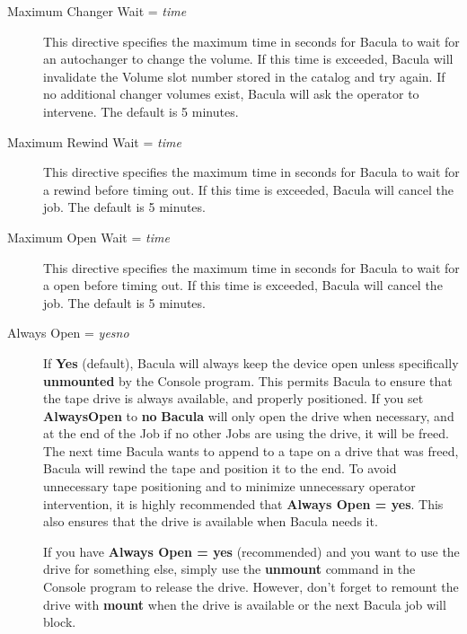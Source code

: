 \begin{description}
\item [Maximum Changer Wait = {\it time}]
   This directive specifies the maximum time in seconds for Bacula to wait
   for an autochanger to change the volume.  If this time is exceeded,
   Bacula will invalidate the Volume slot number stored in the catalog and
   try again.  If no additional changer volumes exist, Bacula will ask the
   operator to intervene.  The default is 5 minutes.      

\item [Maximum Rewind Wait = {\it time}]
   This directive specifies the maximum time in seconds for Bacula to wait
   for a rewind before timing out.  If this time is exceeded,
   Bacula will cancel the job.  The default is 5 minutes.

\item [Maximum Open Wait = {\it time}]
   This directive specifies the maximum time in seconds for Bacula to wait
   for a open before timing out.  If this time is exceeded,
   Bacula will cancel the job.  The default is 5 minutes.

\item [Always Open = {\it yes\vb{}no}]
   If {\bf Yes} (default), Bacula will always keep the device open unless
   specifically {\bf unmounted} by the Console program.  This permits
   Bacula to ensure that the tape drive is always available, and properly
   positioned. If you set
   {\bf AlwaysOpen} to {\bf no} {\bf Bacula} will only open the drive when
   necessary, and at the end of the Job if no other Jobs are using the
   drive, it will be freed.  The next time Bacula wants to append to a tape
   on a drive that was freed, Bacula will rewind the tape and position it to
   the end.  To avoid unnecessary tape positioning and to minimize
   unnecessary operator intervention, it is highly recommended that {\bf
   Always Open = yes}.  This also ensures that the drive is available when
   Bacula needs it.
   
   If you have {\bf Always Open = yes} (recommended) and you want to use the
   drive for something else, simply use the {\bf unmount} command in the
   Console program to release the drive. However, don't forget to remount the
   drive with {\bf mount} when the drive is available or the next Bacula job
   will block.
   

\end{description}
